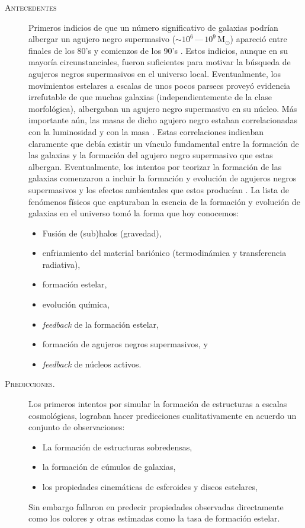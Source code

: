 \documentclass[xcolor=dvipsnames,4pt,hyperref={colorlinks,citecolor=black,linkcolor=black,urlcolor=black}]{beamer}
\begin{document}
\begin{frame}[allowframebreaks]{\textsc{Antecedentes}}
\begin{description}
Primeros indicios de que un número significativo de galaxias podrían albergar un agujero negro
supermasivo ($\sim10^6\,$---$\,10^9\,$M$_\odot$) apareció entre finales de los 80's y comienzos de
los 90's \citep[véase][para una revisión]{Kormendy1995}. Estos indicios, aunque en su mayoría
circunstanciales, fueron suficientes para motivar la búsqueda de agujeros negros supermasivos en el
universo local. Eventualmente, los movimientos estelares a escalas de unos pocos parsecs proveyó
evidencia irrefutable de que muchas galaxias (independientemente de la clase morfológica),
albergaban un agujero negro supermasivo en su núcleo. Más importante aún, las masas de dicho agujero
negro estaban correlacionadas con la luminosidad \citep{Magorrian1998} y con la masa \citep[medida
con la dispersión de velocidades central][]{Ferrarese2000}. Estas correlaciones indicaban claramente
que debía existir un vínculo fundamental entre la formación de las galaxias y la formación del
agujero negro supermasivo que estas albergan. Eventualmente, los intentos por teorizar la formación
de las galaxias comenzaron a incluir la formación y evolución de agujeros negros supermasivos y los
efectos ambientales que estos producían \citep[e.\,g.][]{Springel2005d}. La lista de fenómenos
físicos que capturaban la esencia de la formación y evolución de galaxias en el universo tomó la
forma que hoy conocemos:
%
\begin{itemize}
\item Fusión de (sub)halos (gravedad),
\item enfriamiento del material bariónico (termodinámica y transferencia radiativa),
\item formación estelar,
\item evolución química,
\item \emph{feedback} de la formación estelar,
\item formación de agujeros negros supermasivos, y
\item \emph{feedback} de núcleos activos.
\end{itemize}
%
\item[\textsc{Predicciones.}] Los primeros intentos por simular la formación de estructuras a
escalas cosmológicas, lograban hacer predicciones cualitativamente en acuerdo un conjunto de
observaciones:
%
\begin{itemize}
%
\item La formación de estructuras sobredensas,
\item la formación de cúmulos de galaxias,
\item los propiedades cinemáticas de esferoides y discos estelares,
%
\end{itemize}
%
Sin embargo fallaron en predecir propiedades observadas directamente como los colores y otras
estimadas como la tasa de formación estelar.
%
\end{description}


\end{frame}
\end{document}
